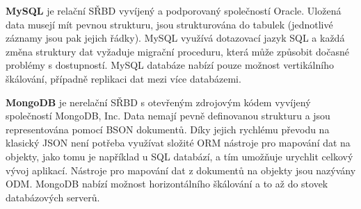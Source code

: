 \textbf{MySQL} je relační \gls{SŘBD} vyvíjený a podporovaný společností Oracle.
Uložená data musejí mít pevnou strukturu, jsou strukturována do tabulek (jednotlivé záznamy jsou pak jejich řádky).
MySQL využívá dotazovací jazyk SQL a každá změna struktury dat vyžaduje migrační proceduru, která může způsobit dočasné problémy s dostupností.
MySQL databáze nabízí pouze možnost vertikálního škálování, případně replikaci dat mezi více databázemi.~\cite{mongo:about}

\textbf{MongoDB} je nerelační \gls{SŘBD} s otevřeným zdrojovým kódem vyvíjený společností MongoDB, Inc.
Data nemají pevně definovanou strukturu a jsou representována pomocí \gls{BSON} dokumentů.
Díky jejich rychlému převodu na klasický \gls{JSON} není potřeba využívat složité \gls{ORM} nástroje pro mapování dat na objekty, jako tomu je například u \gls{SQL} databází, a tím umožňuje urychlit celkový vývoj aplikací.
Nástroje pro mapování dat z dokumentů na objekty jsou nazývány \gls{ODM}.
MongoDB nabízí možnost horizontálního škálování a to až do stovek databázových serverů.~\cite{mongo:about}
